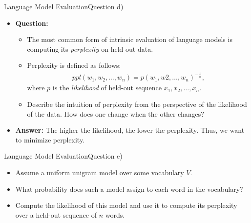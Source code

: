 \documentclass[t]{beamer}
\begin{document}
\begin{frame}{Language Model Evaluation}{Question d)}
    \begin{itemize}
        \item \textbf{Question:}
              \begin{itemize}
                  \item The most common form of intrinsic evaluation of language
                        models is computing its \emph{perplexity} on held-out
                        data.
                  \item Perplexity is defined as follows:
                        \begin{align*}
                            ppl(w_1,w_2,\ldots,w_n) = p(w_1,w2,\ldots,w_n)^{-\frac{1}{n}},
                        \end{align*}
                        where $p$ is the \emph{likelihood} of held-out sequence
                        $x_1, x_2, \ldots, x_n$.
                  \item Describe the intuition of perplexity from the
                        perspective of the likelihood of the data. How does one
                        change when the other changes?
              \end{itemize}
              \pause
        \item \textbf{Answer:} The higher the likelihood, the lower the
              perplexity. Thus, we want to minimize perplexity.
    \end{itemize}
\end{frame}

\begin{frame}{Language Model Evaluation}{Question e)}
    \begin{itemize}
        \item Assume a uniform unigram model over some vocabulary $V$.
        \item What probability does such a model assign to each word in the
              vocabulary?
        \item Compute the likelihood of this model and use it to compute its
              perplexity over a held-out sequence of $n$ words.
    \end{itemize}
\end{frame}
\end{document}

